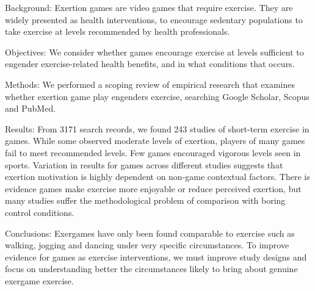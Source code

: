 Background: Exertion games are video games that require exercise. They are widely presented as health interventions, to encourage sedentary populations to take exercise at levels recommended by health professionals. 

Objectives: We consider whether games encourage exercise at levels sufficient to engender exercise-related health benefits, and in what conditions that occurs. 

Methods: We performed a scoping review of empirical research that examines whether exertion game play engenders exercise, searching Google Scholar, Scopus and PubMed.

Results: From 3171 search records, we found 243 studies of  short-term exercise in games. While some observed moderate levels of exertion, players of many games fail to meet recommended levels. Few games encouraged vigorous levels seen in sports. Variation in results for games across different studies suggests that exertion motivation is highly dependent on non-game contextual factors. There is evidence games make exercise more enjoyable or reduce perceived exertion, but many studies suffer the methodological problem of comparison with boring control conditions.

Conclusions: Exergames have only been found comparable to exercise such as walking, jogging and dancing under very specific circumstances. To improve evidence for games as exercise interventions, we must improve study designs and focus on understanding better the circumstances likely to bring about genuine exergame exercise. 
